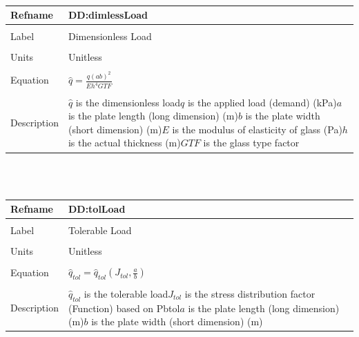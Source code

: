 \documentclass[12pt]{article}
\begin{document}
~\newline
\noindent \begin{minipage}{\textwidth}
\begin{tabular}{p{} p{}}
\toprule \textbf{Refname} & \textbf{DD:dimlessLoad}
\label{DD:dimlessLoad}
\\ \midrule \\
Label & Dimensionless Load
\\ \midrule \\
Units & Unitless
\\ \midrule \\
Equation & $\hat{q}=\frac{q \left(a b\right)^{2}}{E h^{4} GTF}$
\\ \midrule \\
Description & $\hat{q}$ is the dimensionless load\newline$q$ is the applied load (demand) (kPa)\newline$a$ is the plate length (long dimension) (m)\newline$b$ is the plate width (short dimension) (m)\newline$E$ is the modulus of elasticity of glass (Pa)\newline$h$ is the actual thickness (m)\newline$GTF$ is the glass type factor
\\ \bottomrule \end{tabular}
\end{minipage}\\
~\newline
\noindent \begin{minipage}{\textwidth}
\begin{tabular}{p{} p{}}
\toprule \textbf{Refname} & \textbf{DD:tolLoad}
\label{DD:tolLoad}
\\ \midrule \\
Label & Tolerable Load
\\ \midrule \\
Units & Unitless
\\ \midrule \\
Equation & ${\hat{q}_{tol}}={\hat{q}_{tol}}\left({J_{tol}},\frac{a}{b}\right)$
\\ \midrule \\
Description & ${\hat{q}_{tol}}$ is the tolerable load\newline${J_{tol}}$ is the stress distribution factor (Function) based on Pbtol\newline$a$ is the plate length (long dimension) (m)\newline$b$ is the plate width (short dimension) (m)
\\ \bottomrule \end{tabular}
\end{minipage}\\
\end{document}
